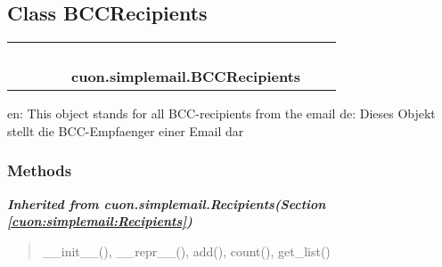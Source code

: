 

\subsection{Class BCCRecipients}

    \label{cuon:simplemail:BCCRecipients}
\begin{tabular}{cccccccc}
\multicolumn{2}{r}{\settowidth{\BCL}{object}\multirow{2}{\BCL}{object}}
&&
&&
  \\\cline{3-3}
  &&\multicolumn{1}{c|}{}
&&
&&
  \\
\multicolumn{4}{r}{\settowidth{\BCL}{cuon.simplemail.Recipients}\multirow{2}{\BCL}{cuon.simplemail.Recipients}}
&&
  \\\cline{5-5}
  &&&&\multicolumn{1}{c|}{}
&&
  \\
&&&&\multicolumn{2}{l}{\textbf{cuon.simplemail.BCCRecipients}}
\end{tabular}

en: This object stands for all BCC-recipients from the email de: Dieses 
Objekt stellt die BCC-Empfaenger einer Email dar



  \subsubsection{Methods}


\large{\textbf{\textit{Inherited from cuon.simplemail.Recipients\textit{(Section \ref{cuon:simplemail:Recipients})}}}}

\begin{quote}
\_\_init\_\_(), \_\_repr\_\_(), add(), count(), get\_list()
\end{quote}

